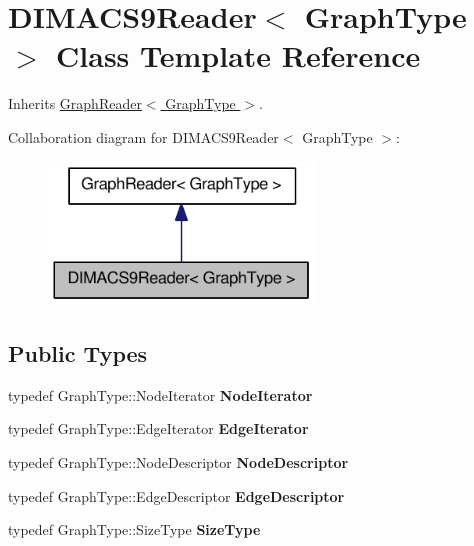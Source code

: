 \hypertarget{class_d_i_m_a_c_s9_reader}{
\section{DIMACS9Reader$<$ GraphType $>$ Class Template Reference}
\label{class_d_i_m_a_c_s9_reader}
}


Inherits \hyperlink{class_graph_reader}{GraphReader$<$ GraphType $>$}.



Collaboration diagram for DIMACS9Reader$<$ GraphType $>$:\nopagebreak
\begin{figure}[H]
\begin{center}
\leavevmode
\includegraphics[width=200pt]{class_d_i_m_a_c_s9_reader__coll__graph}
\end{center}
\end{figure}
\subsection*{Public Types}
\begin{DoxyCompactItemize}
\item 
\hypertarget{class_d_i_m_a_c_s9_reader_a44e258068378cacf7c4f40e50fbe1dd9}{
typedef GraphType::NodeIterator {\bfseries NodeIterator}}
\label{class_d_i_m_a_c_s9_reader_a44e258068378cacf7c4f40e50fbe1dd9}

\item 
\hypertarget{class_d_i_m_a_c_s9_reader_aaf551b8ded6fcfade6c54d3514c280df}{
typedef GraphType::EdgeIterator {\bfseries EdgeIterator}}
\label{class_d_i_m_a_c_s9_reader_aaf551b8ded6fcfade6c54d3514c280df}

\item 
\hypertarget{class_d_i_m_a_c_s9_reader_aca3c1b8add9dc3391d27a63b4faa8c4e}{
typedef GraphType::NodeDescriptor {\bfseries NodeDescriptor}}
\label{class_d_i_m_a_c_s9_reader_aca3c1b8add9dc3391d27a63b4faa8c4e}

\item 
\hypertarget{class_d_i_m_a_c_s9_reader_a6a5c86f366552afa043654eabd3abc10}{
typedef GraphType::EdgeDescriptor {\bfseries EdgeDescriptor}}
\label{class_d_i_m_a_c_s9_reader_a6a5c86f366552afa043654eabd3abc10}

\item 
\hypertarget{class_d_i_m_a_c_s9_reader_a59fb86bec2641c7946614346e657d5f1}{
typedef GraphType::SizeType {\bfseries SizeType}}
\label{class_d_i_m_a_c_s9_reader_a59fb86bec2641c7946614346e657d5f1}

\end{DoxyCompactItemize}
